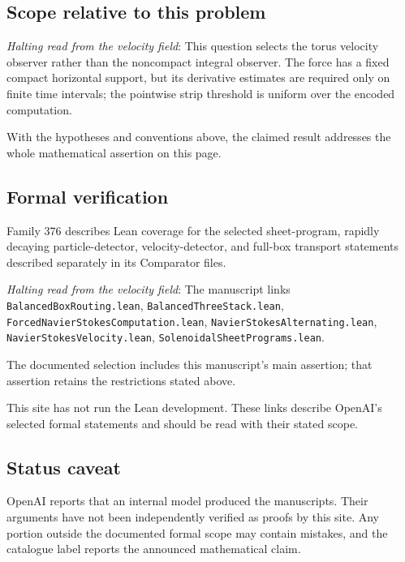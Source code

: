 \documentclass[11pt]{article}
\begin{document}
\subsection{Scope relative to this problem}
\textit{Halting read from the velocity field}: This question selects the torus velocity observer rather than the noncompact integral observer. The force has a fixed compact horizontal support, but its derivative estimates are required only on finite time intervals; the pointwise strip threshold is uniform over the encoded computation.

With the hypotheses and conventions above, the claimed result addresses the whole mathematical assertion on this page.

\subsection{Formal verification}
Family 376 describes Lean coverage for the selected sheet-program, rapidly decaying particle-detector, velocity-detector, and full-box transport statements described separately in its Comparator files.

\textit{Halting read from the velocity field}: The manuscript links \texttt{BalancedBoxRouting.lean}, \texttt{BalancedThreeStack.lean}, \texttt{ForcedNavierStokesComputation.lean}, \texttt{NavierStokesAlternating.lean}, \texttt{NavierStokesVelocity.lean}, \texttt{SolenoidalSheetPrograms.lean}.

The documented selection includes this manuscript’s main assertion; that assertion retains the restrictions stated above.

This site has not run the Lean development. These links describe OpenAI’s selected formal statements and should be read with their stated scope.

\subsection{Status caveat}
OpenAI reports that an internal model produced the manuscripts. Their arguments have not been independently verified as proofs by this site. Any portion outside the documented formal scope may contain mistakes, and the catalogue label reports the announced mathematical claim.
\end{document}

